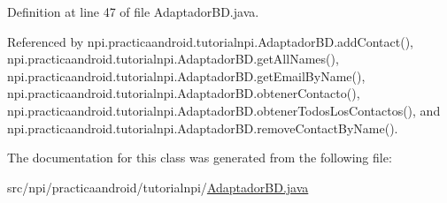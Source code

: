 Definition at line 47 of file Adaptador\-B\-D.\-java.



Referenced by npi.\-practicaandroid.\-tutorialnpi.\-Adaptador\-B\-D.\-add\-Contact(), npi.\-practicaandroid.\-tutorialnpi.\-Adaptador\-B\-D.\-get\-All\-Names(), npi.\-practicaandroid.\-tutorialnpi.\-Adaptador\-B\-D.\-get\-Email\-By\-Name(), npi.\-practicaandroid.\-tutorialnpi.\-Adaptador\-B\-D.\-obtener\-Contacto(), npi.\-practicaandroid.\-tutorialnpi.\-Adaptador\-B\-D.\-obtener\-Todos\-Los\-Contactos(), and npi.\-practicaandroid.\-tutorialnpi.\-Adaptador\-B\-D.\-remove\-Contact\-By\-Name().



The documentation for this class was generated from the following file\-:\begin{DoxyCompactItemize}
\item 
src/npi/practicaandroid/tutorialnpi/\hyperlink{_adaptador_b_d_8java}{Adaptador\-B\-D.\-java}\end{DoxyCompactItemize}
